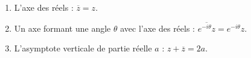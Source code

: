 \begin{proposition}
	\begin{enumerate}
		\item L'axe des réels : $\overline{z} = z$.
		\item Un axe formant une angle $\theta$ avec l'axe des réels : $\overline{e^{-i \theta}z} = e^{-i \theta} z$.
		\item L'asymptote verticale de partie réelle $a$ : $z + \overline{z} = 2a$.
	\end{enumerate}
\end{proposition}